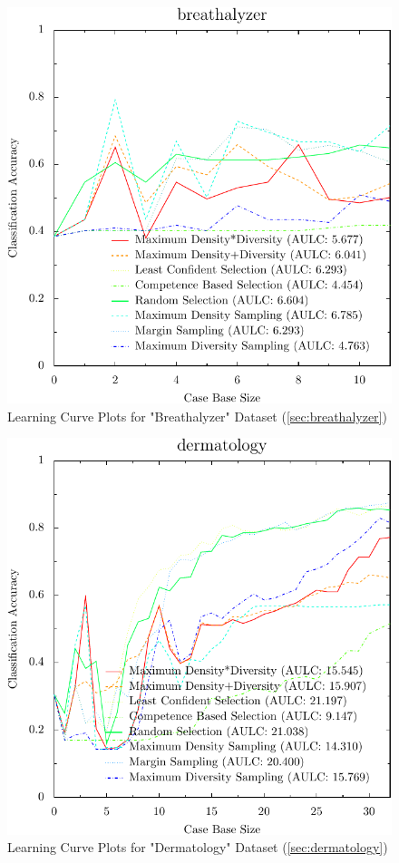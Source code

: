 \documentclass[a4paper,11pt]{report}
\begin{document}
\begin{figure}[h!]
\includegraphics{./Plots/breathalyzer}
\caption{Learning Curve Plots for "Breathalyzer" Dataset (\ref{sec:breathalyzer})}
\end{figure}

\begin{figure}[h!]
\includegraphics{./Plots/dermatology}
\caption{Learning Curve Plots for "Dermatology" Dataset (\ref{sec:dermatology})}
\end{figure}
\end{document}
